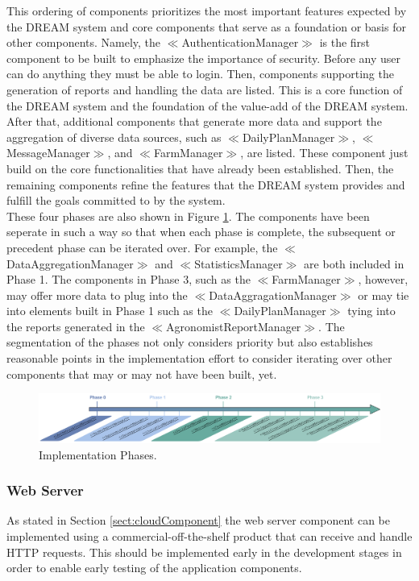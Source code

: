 \noindent
This ordering of components prioritizes the most important features expected by the DREAM system and core components that serve as a foundation or basis for other components. Namely, the \(\ll\)AuthenticationManager\(\gg\) is the first component to be built to emphasize the importance of security. Before any user can do anything they must be able to login. Then, components supporting the generation of reports and handling the data are listed. This is a core function of the DREAM system and the foundation of the value-add of the DREAM system. After that, additional components that generate more data and support the aggregation of diverse data sources, such as \(\ll\)DailyPlanManager\(\gg\), \(\ll\)MessageManager\(\gg\), and \(\ll\)FarmManager\(\gg\), are listed. These component just build on the core functionalities that have already been established. Then, the remaining components refine the features that the DREAM system provides and fulfill the goals committed to by the system. \smallskip\\
\noindent
These four phases are also shown in Figure \ref{fig:implementationPhases}. The components have been seperate in such a way so that when each phase is complete, the subsequent or precedent phase can be iterated over. For example, the \(\ll\)DataAggregationManager\(\gg\) and \(\ll\)StatisticsManager\(\gg\) are both included in Phase 1. The components in Phase 3, such as the \(\ll\)FarmManager\(\gg\), however, may offer more data to plug into the \(\ll\)DataAggragationManager\(\gg\) or may tie into elements built in Phase 1 such as the \(\ll\)DailyPlanManager\(\gg\) tying into the reports generated in the \(\ll\)AgronomistReportManager\(\gg\). The segmentation of the phases not only considers priority but also establishes reasonable points in the implementation effort to consider iterating over other components that may or may not have been built, yet. 

\begin{figure}[hbt!]
\centering
\includegraphics[width=\textwidth]{../images_diagrams/dd/implementation_phases.png}
\caption{Implementation Phases.}
\label{fig:implementationPhases}
\end{figure}

\subsubsection{Web Server}
\noindent
As stated in Section \ref{sect:cloudComponent} the web server component can be implemented using a commercial-off-the-shelf product that can receive and handle HTTP requests. This should be implemented early in the development stages in order to enable early testing of the application components. 


